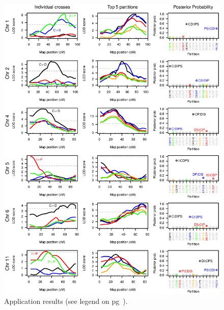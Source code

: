 \documentclass[12pt,letterpaper]{article}
\begin{document}
\newpage
\begin{figure}
\centering
\includegraphics[width=6.2in]{Figs/fig6.eps}

\vspace{5mm}

\caption{Application results (see legend on pg~\pageref{fig6legend}).\label{fig:app}}
\end{figure}
\end{document}

